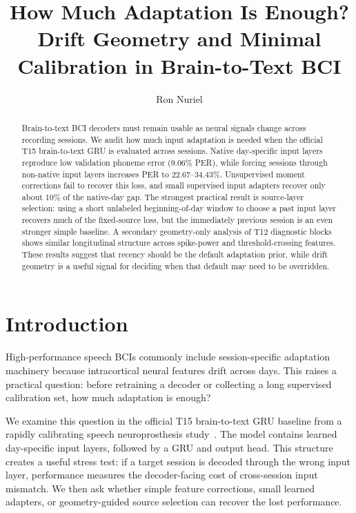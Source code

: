 \documentclass[10pt]{article}
\title{How Much Adaptation Is Enough?\\Drift Geometry and Minimal Calibration in Brain-to-Text BCI}
\author{Ron Nuriel}
\date{}
\begin{document}
\maketitle

\begin{abstract}
Brain-to-text BCI decoders must remain usable as neural signals change across
recording sessions. We audit how much input adaptation is needed when the
official T15 brain-to-text GRU is evaluated across sessions. Native day-specific
input layers reproduce low validation phoneme error (9.06\% PER), while forcing
sessions through non-native input layers increases PER to 22.67--34.43\%.
Unsupervised moment corrections fail to recover this loss, and small supervised
input adapters recover only about 10\% of the native-day gap. The strongest
practical result is source-layer selection: using a short unlabeled
beginning-of-day window to choose a past input layer recovers much of the
fixed-source loss, but the immediately previous session is an even stronger
simple baseline. A secondary geometry-only analysis of T12 diagnostic blocks
shows similar longitudinal structure across spike-power and threshold-crossing
features. These results suggest that recency should
be the default adaptation prior, while drift geometry is a useful signal for
deciding when that default may need to be overridden.
\end{abstract}

\section{Introduction}
High-performance speech BCIs commonly include session-specific adaptation
machinery because intracortical neural features drift across days. This raises a
practical question: before retraining a decoder or collecting a long supervised
calibration set, how much adaptation is enough?

We examine this question in the official T15 brain-to-text GRU baseline from a
rapidly calibrating speech neuroprosthesis study~\cite{card2024accurate}. The
model contains learned day-specific input layers, followed by a GRU and output
head. This structure creates a useful stress test: if a target session is decoded
through the wrong input layer, performance measures the decoder-facing cost of
cross-session input mismatch. We then ask whether simple feature corrections,
small learned adapters, or geometry-guided source selection can recover the lost
performance.
\end{document}
